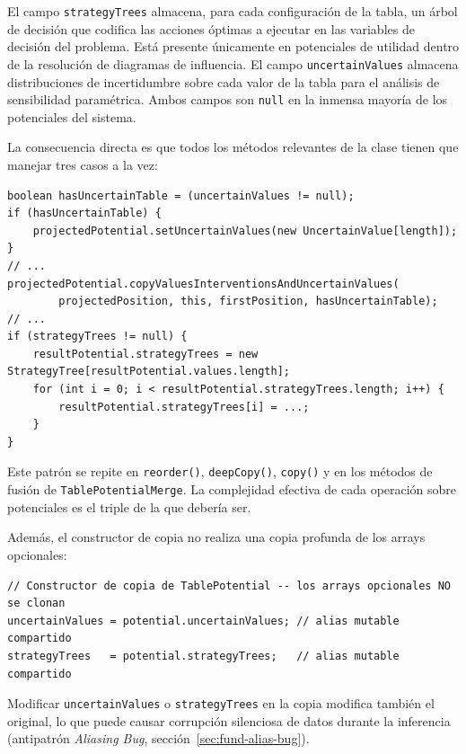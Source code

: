 \documentclass[11pt,a4paper]{article}
\newcommand{\code}[1]{\texttt{#1}}
\begin{document}
El campo \code{strategyTrees} almacena, para cada configuración de la tabla, un
árbol de decisión que codifica las acciones óptimas a ejecutar en las variables
de decisión del problema.  Está presente
únicamente en potenciales de utilidad dentro de la resolución de diagramas de
influencia.  El campo \code{uncertainValues} almacena distribuciones de
incertidumbre sobre cada valor de la tabla para el análisis de sensibilidad
paramétrica.  Ambos campos son \code{null} en la inmensa mayoría de los
potenciales del sistema.

La consecuencia directa es que todos los métodos relevantes de la clase tienen
que manejar tres casos a la vez:

\begin{lstlisting}[caption={Fragmento de \code{tableProject()} con condicionales por campos opcionales}]
boolean hasUncertainTable = (uncertainValues != null);
if (hasUncertainTable) {
    projectedPotential.setUncertainValues(new UncertainValue[length]);
}
// ...
projectedPotential.copyValuesInterventionsAndUncertainValues(
        projectedPosition, this, firstPosition, hasUncertainTable);
// ...
if (strategyTrees != null) {
    resultPotential.strategyTrees = new StrategyTree[resultPotential.values.length];
    for (int i = 0; i < resultPotential.strategyTrees.length; i++) {
        resultPotential.strategyTrees[i] = ...;
    }
}
\end{lstlisting}

Este patrón se repite en \code{reorder()}, \code{deepCopy()}, \code{copy()} y
en los métodos de fusión de \code{TablePotentialMerge}.  La complejidad
efectiva de cada operación sobre potenciales es el triple de la que debería
ser.

Además, el constructor de copia no realiza una copia profunda de los arrays
opcionales:

\begin{lstlisting}[caption={Error de copia superficial en el constructor de copia}]
// Constructor de copia de TablePotential -- los arrays opcionales NO se clonan
uncertainValues = potential.uncertainValues; // alias mutable compartido
strategyTrees   = potential.strategyTrees;   // alias mutable compartido
\end{lstlisting}

Modificar \code{uncertainValues} o \code{strategyTrees} en la copia modifica
también el original, lo que puede causar corrupción silenciosa de datos durante
la inferencia (antipatrón \emph{Aliasing Bug}, sección~\ref{sec:fund-alias-bug}).
\end{document}
